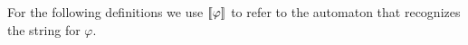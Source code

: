 For the following definitions we use $[\![\varphi]\!]$ to refer to the automaton that recognizes the string for $\varphi$.





